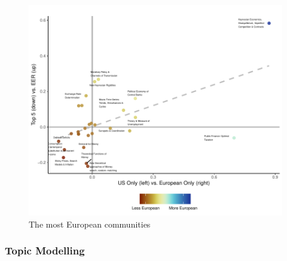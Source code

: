 \documentclass[]{elsarticle} %
\begin{document}
\begin{figure}[h]

{\centering \includegraphics{First_version_files/figure-latex/plot-community-diff-1} 

}

\caption{The most European communities}\label{fig:plot-community-diff}
\end{figure}

\hypertarget{topic-modelling}{%
\subsubsection{Topic Modelling}\label{topic-modelling}}
\end{document}
